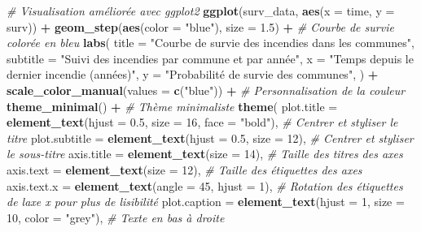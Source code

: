 \documentclass[
]{article}
\newenvironment{Shaded}{\begin{snugshade}}{\end{snugshade}}
\newcommand{\AttributeTok}[1]{\textcolor[rgb]{0.13,0.29,0.53}{#1}}
\newcommand{\CommentTok}[1]{\textcolor[rgb]{0.56,0.35,0.01}{\textit{#1}}}
\newcommand{\DecValTok}[1]{\textcolor[rgb]{0.00,0.00,0.81}{#1}}
\newcommand{\FloatTok}[1]{\textcolor[rgb]{0.00,0.00,0.81}{#1}}
\newcommand{\FunctionTok}[1]{\textcolor[rgb]{0.13,0.29,0.53}{\textbf{#1}}}
\newcommand{\NormalTok}[1]{#1}
\newcommand{\SpecialCharTok}[1]{\textcolor[rgb]{0.81,0.36,0.00}{\textbf{#1}}}
\newcommand{\StringTok}[1]{\textcolor[rgb]{0.31,0.60,0.02}{#1}}
\begin{document}
\begin{Shaded}
\begin{Highlighting}[]
\CommentTok{\# Visualisation améliorée avec ggplot2}
\FunctionTok{ggplot}\NormalTok{(surv\_data, }\FunctionTok{aes}\NormalTok{(}\AttributeTok{x =}\NormalTok{ time, }\AttributeTok{y =}\NormalTok{ surv)) }\SpecialCharTok{+}
  \FunctionTok{geom\_step}\NormalTok{(}\FunctionTok{aes}\NormalTok{(}\AttributeTok{color =} \StringTok{"blue"}\NormalTok{), }\AttributeTok{size =} \FloatTok{1.5}\NormalTok{) }\SpecialCharTok{+}  \CommentTok{\# Courbe de survie colorée en bleu}
  \FunctionTok{labs}\NormalTok{(}
    \AttributeTok{title =} \StringTok{"Courbe de survie des incendies dans les communes"}\NormalTok{,}
    \AttributeTok{subtitle =} \StringTok{"Suivi des incendies par commune et par année"}\NormalTok{,}
    \AttributeTok{x =} \StringTok{"Temps depuis le dernier incendie (années)"}\NormalTok{,}
    \AttributeTok{y =} \StringTok{"Probabilité de survie des communes"}\NormalTok{,}
\NormalTok{  ) }\SpecialCharTok{+}
  \FunctionTok{scale\_color\_manual}\NormalTok{(}\AttributeTok{values =} \FunctionTok{c}\NormalTok{(}\StringTok{"blue"}\NormalTok{)) }\SpecialCharTok{+}  \CommentTok{\# Personnalisation de la couleur}
  \FunctionTok{theme\_minimal}\NormalTok{() }\SpecialCharTok{+}  \CommentTok{\# Thème minimaliste}
  \FunctionTok{theme}\NormalTok{(}
    \AttributeTok{plot.title =} \FunctionTok{element\_text}\NormalTok{(}\AttributeTok{hjust =} \FloatTok{0.5}\NormalTok{, }\AttributeTok{size =} \DecValTok{16}\NormalTok{, }\AttributeTok{face =} \StringTok{"bold"}\NormalTok{),  }\CommentTok{\# Centrer et styliser le titre}
    \AttributeTok{plot.subtitle =} \FunctionTok{element\_text}\NormalTok{(}\AttributeTok{hjust =} \FloatTok{0.5}\NormalTok{, }\AttributeTok{size =} \DecValTok{12}\NormalTok{),  }\CommentTok{\# Centrer et styliser le sous{-}titre}
    \AttributeTok{axis.title =} \FunctionTok{element\_text}\NormalTok{(}\AttributeTok{size =} \DecValTok{14}\NormalTok{),  }\CommentTok{\# Taille des titres des axes}
    \AttributeTok{axis.text =} \FunctionTok{element\_text}\NormalTok{(}\AttributeTok{size =} \DecValTok{12}\NormalTok{),  }\CommentTok{\# Taille des étiquettes des axes}
    \AttributeTok{axis.text.x =} \FunctionTok{element\_text}\NormalTok{(}\AttributeTok{angle =} \DecValTok{45}\NormalTok{, }\AttributeTok{hjust =} \DecValTok{1}\NormalTok{),  }\CommentTok{\# Rotation des étiquettes de l\textquotesingle{}axe x pour plus de lisibilité}
    \AttributeTok{plot.caption =} \FunctionTok{element\_text}\NormalTok{(}\AttributeTok{hjust =} \DecValTok{1}\NormalTok{, }\AttributeTok{size =} \DecValTok{10}\NormalTok{, }\AttributeTok{color =} \StringTok{"grey"}\NormalTok{),  }\CommentTok{\# Texte en bas à droite}

\end{Highlighting}
\end{Shaded}
\end{document}
